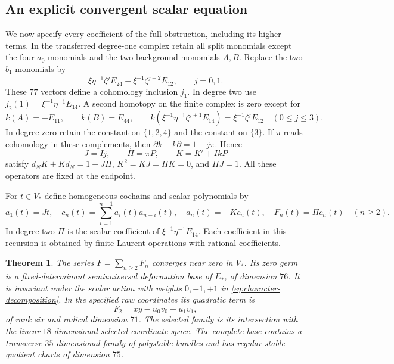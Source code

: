 \documentclass[11pt]{amsart}
\newtheorem{theorem}{Theorem}[section]
\theoremstyle{definition}
\theoremstyle{remark}
\begin{document}
\subsection{An explicit convergent scalar equation}
We now specify every coefficient of the full obstruction, including its
higher terms. In the transferred degree-one complex retain all split
monomials except the four $a_0$ monomials and the two background
monomials $A,B$. Replace the two $b_1$ monomials by
\begin{equation}\label{eq:endpoint-basis}
 \xi\eta^{-1}\zeta^jE_{24}-\xi^{-1}\zeta^{j+2}E_{12},
 \qquad j=0,1.
\end{equation}
These $77$ vectors define a cohomology inclusion $j_1$.
In degree two use $j_2(1)=\xi^{-1}\eta^{-1}E_{14}$.
A second homotopy on the finite complex is zero except for
\begin{equation}\label{eq:second-homotopy}
 k(A)=-E_{11},\qquad k(B)=E_{44},\qquad
 k(\xi^{-1}\eta^{-1}\zeta^{j+1}E_{14})
       =\xi^{-1}\zeta^jE_{12}\quad(0\le j\le3).
\end{equation}
In degree zero retain the constant on $\{1,2,4\}$ and the constant
on $\{3\}$. If $\pi$ reads cohomology in these complements,
then $\partial k+k\partial=1-j\pi$. Hence
\begin{equation}\label{eq:endpoint-contraction}
 J=Ij,\qquad\Pi=\pi P,\qquad K=K'+IkP
\end{equation}
satisfy $d_NK+Kd_N=1-J\Pi$, $K^2=KJ=\Pi K=0$, and $\Pi J=1$.
All these operators are fixed at the endpoint.

For $t\in V_*$ define homogeneous cochains and scalar polynomials by
\begin{equation}\label{eq:full-recursion}
 a_1(t)=Jt,\quad c_n(t)=\sum_{i=1}^{n-1}a_i(t)a_{n-i}(t),\quad
 a_n(t)=-Kc_n(t),\quad F_n(t)=\Pi c_n(t)\quad(n\ge2).
\end{equation}
In degree two $\Pi$ is the scalar coefficient of
$\xi^{-1}\eta^{-1}E_{14}$. Each coefficient in this recursion is
obtained by finite Laurent operations with rational coefficients.

\begin{theorem}\label{thm:endpoint-base}
The series $F=\sum_{n\ge2}F_n$ converges near zero in $V_*$.
Its zero germ is a fixed-determinant semiuniversal deformation base of
$E_*$, of dimension $76$. It is invariant under the scalar action
with weights $0,-1,+1$ in \eqref{eq:character-decomposition}.
In the specified raw coordinates its quadratic term is
\begin{equation}\label{eq:full-quadratic}
 F_2=xy-u_0v_0-u_1v_1,
\end{equation}
of rank six and radical dimension $71$. The selected family is its
intersection with the linear $18$-dimensional selected coordinate space.
The complete base contains a transverse $35$-dimensional family of
polystable bundles and has regular stable quotient charts of dimension $75$.
\end{theorem}
\end{document}
